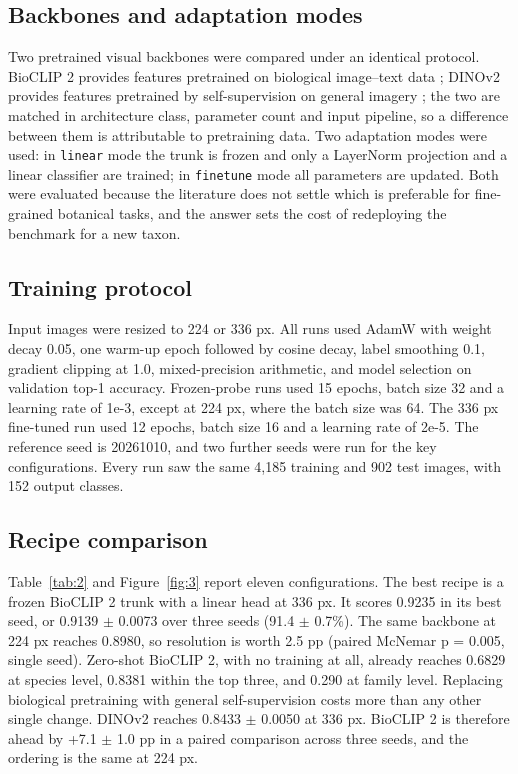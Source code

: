 \documentclass[preprint,12pt,authoryear]{elsarticle}
\begin{document}
\subsection{Backbones and adaptation modes}\label{sec:4.1}

Two pretrained visual backbones were compared under an identical protocol. BioCLIP 2 provides features pretrained on biological image--text data \citep{gu2025}; DINOv2 provides features pretrained by self-supervision on general imagery \citep{oquab2024}; the two are matched in architecture class, parameter count and input pipeline, so a difference between them is attributable to pretraining data. Two adaptation modes were used: in \texttt{linear} mode the trunk is frozen and only a LayerNorm projection and a linear classifier are trained; in \texttt{finetune} mode all parameters are updated. Both were evaluated because the literature does not settle which is preferable for fine-grained botanical tasks, and the answer sets the cost of redeploying the benchmark for a new taxon.

\setcounter{section}{4}

\setcounter{subsection}{1}

\subsection{Training protocol}\label{sec:4.2}

Input images were resized to 224 or 336 px. All runs used AdamW with weight decay 0.05, one warm-up epoch followed by cosine decay, label smoothing 0.1, gradient clipping at 1.0, mixed-precision arithmetic, and model selection on validation top-1 accuracy. Frozen-probe runs used 15 epochs, batch size 32 and a learning rate of 1e-3, except at 224 px, where the batch size was 64. The 336 px fine-tuned run used 12 epochs, batch size 16 and a learning rate of 2e-5. The reference seed is 20261010, and two further seeds were run for the key configurations. Every run saw the same 4,185 training and 902 test images, with 152 output classes.

\setcounter{section}{4}

\setcounter{subsection}{2}

\subsection{Recipe comparison}\label{sec:4.3}

Table~\ref{tab:2} and Figure~\ref{fig:3} report eleven configurations. The best recipe is a frozen BioCLIP 2 trunk with a linear head at 336 px. It scores 0.9235 in its best seed, or 0.9139 $\pm$ 0.0073 over three seeds (91.4 $\pm$ 0.7\%). The same backbone at 224 px reaches 0.8980, so resolution is worth 2.5 pp (paired McNemar p = 0.005, single seed). Zero-shot BioCLIP 2, with no training at all, already reaches 0.6829 at species level, 0.8381 within the top three, and 0.290 at family level. Replacing biological pretraining with general self-supervision costs more than any other single change. DINOv2 reaches 0.8433 $\pm$ 0.0050 at 336 px. BioCLIP 2 is therefore ahead by +7.1 $\pm$ 1.0 pp in a paired comparison across three seeds, and the ordering is the same at 224 px.
\end{document}
